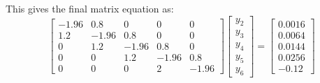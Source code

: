 \documentclass[letterpaper, fontsize=11pt]{scrartcl} %
\numberwithin{equation}{section} %
\numberwithin{figure}{section} %
\numberwithin{table}{section} %
\begin{document}
\begin{enumerate}
\begin{enumerate}
This gives the final matrix equation as:
$$\left[ \begin{array}{ccccc}
-1.96 & 0.8 & 0 & 0 &0 \\
 1.2 &-1.96 &0.8 &0 &0\\
 0&1.2 &-1.96 &0.8 &0\\
0 &0 &1.2 &-1.96 &0.8\\
0&0&0&2&-1.96 
\end{array}
\right] 
\left[ \begin{array}{c}
y_2 \\ y_3 \\ y_4 \\ y_5 \\y_6\end{array} \right]
= \left[\begin{array}{c} 0.0016 \\ 0.0064 \\ 0.0144 \\ 0.0256 \\ -0.12\end{array} \right] $$
\end{enumerate}


\end{enumerate}
\end{document}
